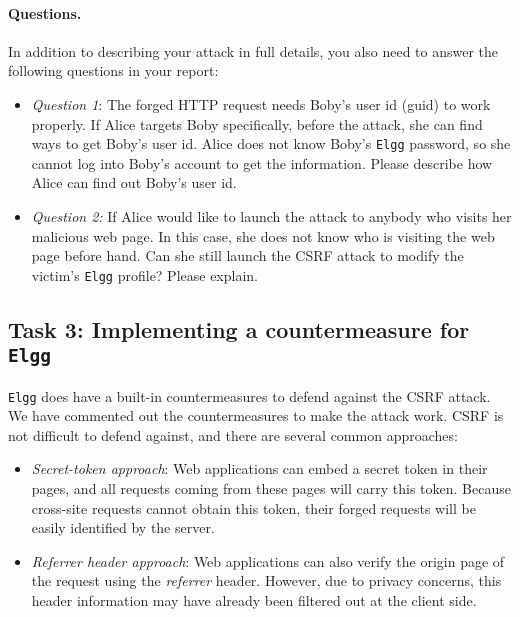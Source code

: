 \paragraph{Questions.}
In addition to describing your attack in full details, you also need to
answer the following questions in your report:
\begin{itemize}

   \item {\em Question 1}: The forged HTTP request needs Boby's user
   id (guid) to work properly. If Alice targets Boby specifically, before
   the attack, she can find ways to get Boby's user id. Alice does not know 
   Boby's {\tt Elgg} password, so she cannot log into Boby's account to get
   the information. Please describe how Alice can find out Boby's user id. 

   
   \item {\em Question 2:} If Alice would like to launch the attack to
   anybody who visits her malicious web page. In this case, she does not
   know who is visiting the web page before hand. Can she still launch the CSRF attack
   to modify the victim's {\tt Elgg} profile? Please explain.
   
\end{itemize}



\subsection{Task 3: Implementing a countermeasure for {\tt Elgg}} 


{\tt Elgg} does have a built-in countermeasures to 
defend against the CSRF attack. 
We have commented out the countermeasures to make the attack work. 
CSRF is not difficult to defend against, and there are several common approaches:

\begin{itemize}
   \item {\em Secret-token approach}: Web applications can embed a secret token
   in their pages, and all requests coming from these pages will carry this 
   token. Because cross-site requests cannot obtain this token, their 
   forged requests will be easily identified by the server.

   \item {\em Referrer header approach}: Web applications can also verify the origin page 
   of the request using the \emph{referrer} header. However, due to privacy
   concerns, this header information may have already been filtered out 
   at the client side.
\end{itemize}


